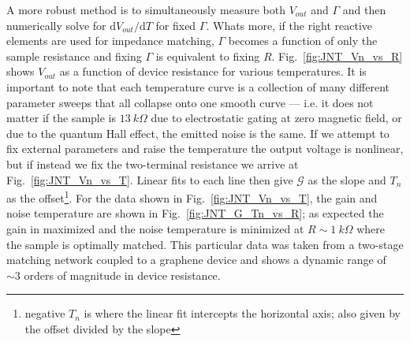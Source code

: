 A more robust method is to simultaneously measure both $V_{out}$ and $\Gamma$ and then numerically solve for $\mathrm{d}V_{out}/\mathrm{d}T$ for fixed $\Gamma$. Whats more, if the right reactive elements are used for impedance matching, $\Gamma$ becomes a function of only the sample resistance and fixing $\Gamma$ is equivalent to fixing $R$. Fig.~\ref{fig:JNT_Vn_vs_R} shows $V_{out}$ as a function of device resistance for various temperatures. It is important to note that each temperature curve is a collection of many different parameter sweeps that all collapse onto one smooth curve --- i.e. it does not matter if the sample is $13~k\Omega$ due to electrostatic gating at zero magnetic field, or due to the quantum Hall effect, the emitted noise is the same. If we attempt to fix external parameters and raise the temperature the output voltage is nonlinear, but if instead we fix the two-terminal resistance we arrive at Fig.~\ref{fig:JNT_Vn_vs_T}. Linear fits to each line then give $\mathcal{G}$ as the slope and $T_n$ as the offset\footnote{negative $T_n$ is where the linear fit intercepts the horizontal axis; also given by the offset divided by the slope}. For the data shown in Fig.~\ref{fig:JNT_Vn_vs_T}, the gain and noise temperature are shown in Fig.~\ref{fig:JNT_G_Tn_vs_R}; as expected the gain in maximized and the noise temperature is minimized at $R\sim 1~k\Omega$ where the sample is optimally matched. This particular data was taken from a two-stage matching network coupled to a graphene device and shows a dynamic range of ${\sim}3$ orders of magnitude in device resistance.


